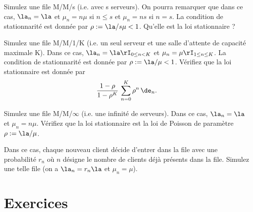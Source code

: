 {{\begin{exo}
  Simulez une file M/M/s (i.e. avec s serveurs).  On pourra remarquer
  que dans ce cas, $\la_n=\la$ et $\mu_n=n\mu$ si $n\leq s$ et
  $\mu_n=ns$ si $n=s$.  La condition de stationnarité est donnée par
  $\rho:=\la/s\mu<1$. Qu'elle est la loi stationnaire ?
\end{exo}

\begin{exo}
  Simulez une file M/M/1/K (i.e. un seul serveur et une salle
  d'attente de capacité maximale K).  Dans ce cas, $\la_n=\la
  \rI_{0\leq n < K}$ et $\mu_n=\mu \rI_{1\leq n \leq K}$.  La
  condition de stationnarité est donnée par $\rho:=\la/\mu<1$.
  Vérifiez que la loi stationnaire est donnée par
  $$
  \frac{1-\rho}{1-\rho^{K}}\,\sum_{n=0}^K \rho^n\,\de_n.
  $$
\end{exo}

\begin{exo}
  Simulez une file M/M/$\infty$ (i.e. une infinité de serveurs).  Dans
  ce cas, $\la_n=\la$ et $\mu_n=n\mu$.  Vérifiez que la loi
  stationnaire est la loi de Poisson de paramètre $\rho:=\la/\mu$.
\end{exo}

\begin{exo}
  Dans ce cas, chaque nouveau client décide d'entrer dans la file avec
  une probabilité $r_n$ où $n$ désigne le nombre de clients déjà
  présents dans la file. Simulez une telle file (on a $\la_n=r_n\la$
  et $\mu_n=\mu$).
\end{exo}

%
\section{Exercices}
%

}}
